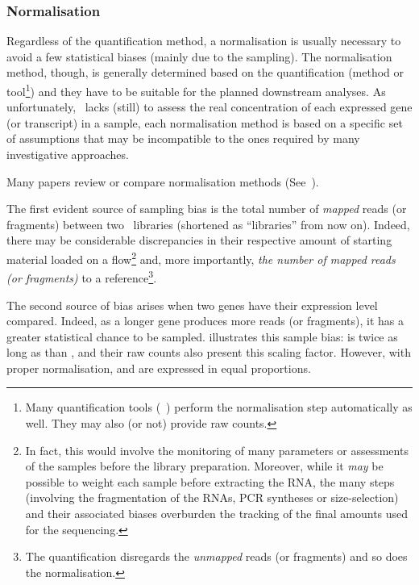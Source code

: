 \subsubsection{Normalisation}\label{subsub:norm}
Regardless of the quantification method, a normalisation is usually
necessary to avoid a few statistical biases (mainly due to the sampling). The
normalisation method, though, is generally determined based on the quantification
(method or tool\footnote{Many quantification tools (\eg\ \cuffl) perform
the normalisation step automatically as well. They may also (or not) provide
raw counts.}) and they have to be suitable for the planned downstream analyses.
As unfortunately, \Rnaseq\ lacks (still) to assess the real concentration of each
expressed gene (or transcript) in a sample, each normalisation method is based on
a specific set of assumptions that may be incompatible to the ones required by
many investigative approaches.

Many papers review or compare normalisation methods (See~\citet{Dillies2013,%
normSigCancerHelp,NormImpact,ruvseqComQN}).

The first evident source of sampling bias is the total number of \emph{mapped}
reads (or fragments) between two \Rnaseq\ libraries (shortened as
\enquote{libraries} from now on). Indeed, there may be considerable discrepancies in
their respective amount of starting material loaded on a
\gls{flow}\footnote{In fact, this would involve the monitoring of many parameters
or assessments of the samples before the library preparation. Moreover, while
it \emph{may} be possible to weight each sample before extracting the \gls{RNA},
the many steps (involving the fragmentation of the \glspl{RNA},
\gls{PCR} syntheses or size-selection) and their associated biases
overburden the tracking of the final amounts used for the sequencing.}
and, more importantly, \emph{the number of mapped reads (or
fragments)} to a reference\footnote{The quantification disregards the
\emph{unmapped} reads (or fragments) and so does the normalisation.}.

The second source of bias arises when two genes have their expression level
compared. Indeed, as a longer gene produces more reads (or fragments), it has a
greater statistical chance to be sampled.  illustrates
this sample bias:  is twice as long as than , and their
raw counts also present this scaling factor. However, with proper normalisation,
 and  are expressed in equal proportions.

